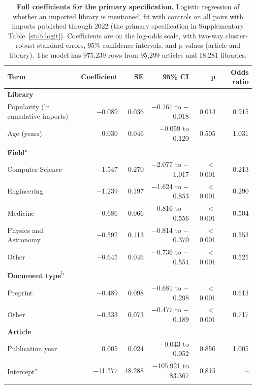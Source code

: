 \documentclass[pdflatex,sn-nature]{sn-jnl}%
\begin{document}
\begin{table}[p]
\caption{\textbf{Full coefficients for the primary specification.} Logistic regression of whether an imported library is mentioned, fit with controls on all pairs with imports published through 2022 (the primary specification in Supplementary Table~\ref{stab:logit}). Coefficients are on the log-odds scale, with two-way cluster-robust standard errors, 95\% confidence intervals, and p-values (article and library). The model has 975,239 rows from 95,299 articles and 18,281 libraries.}\label{stab:primarymodel}
\footnotesize
\setlength{\tabcolsep}{4pt}
\begin{tabular}{@{}lrrrrr@{}}
\toprule
Term & Coefficient & SE & 95\% CI & p & Odds ratio \\
\midrule
\textbf{Library} & & & & & \\
\quad Popularity (ln cumulative imports) & $-$0.089 & 0.036 & $-$0.161 to $-$0.018 & 0.014 & 0.915 \\
\quad Age (years) & 0.030 & 0.046 & $-$0.059 to 0.120 & 0.505 & 1.031 \\
\addlinespace
\textbf{Field}\textsuperscript{a} & & & & & \\
\quad Computer Science & $-$1.547 & 0.270 & $-$2.077 to $-$1.017 & $<$0.001 & 0.213 \\
\quad Engineering & $-$1.239 & 0.197 & $-$1.624 to $-$0.853 & $<$0.001 & 0.290 \\
\quad Medicine & $-$0.686 & 0.066 & $-$0.816 to $-$0.556 & $<$0.001 & 0.504 \\
\quad Physics and Astronomy & $-$0.592 & 0.113 & $-$0.814 to $-$0.370 & $<$0.001 & 0.553 \\
\quad Other & $-$0.645 & 0.046 & $-$0.736 to $-$0.554 & $<$0.001 & 0.525 \\
\addlinespace
\textbf{Document type}\textsuperscript{b} & & & & & \\
\quad Preprint & $-$0.489 & 0.098 & $-$0.681 to $-$0.298 & $<$0.001 & 0.613 \\
\quad Other & $-$0.333 & 0.073 & $-$0.477 to $-$0.189 & $<$0.001 & 0.717 \\
\addlinespace
\textbf{Article} & & & & & \\
\quad Publication year & 0.005 & 0.024 & $-$0.043 to 0.052 & 0.850 & 1.005 \\
\quad Intercept\textsuperscript{c} & $-$11.277 & 48.288 & $-$105.921 to 83.367 & 0.815 & -- \\
\botrule
\end{tabular}
\end{table}
\end{document}
